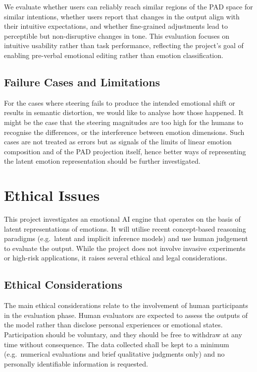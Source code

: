 \documentclass[12pt,twoside]{report}
\begin{document}
We evaluate whether users can reliably reach similar regions of the PAD space for similar intentions, whether users report that changes in the output align with their intuitive expectations, and whether fine-grained adjustments lead to perceptible but non-disruptive changes in tone. This evaluation focuses on intuitive usability rather than task performance, reflecting the project’s goal of enabling pre-verbal emotional editing rather than emotion classification.

\section{Failure Cases and Limitations}

For the cases where steering fails to produce the intended emotional shift or results in semantic distortion, we would like to analyse how those happened. It might be the case that the steering magnitudes are too high for the humans to recognise the differences, or the interference between emotion dimensions. Such cases are not treated as errors but as signals of the limits of linear emotion composition and of the PAD projection itself, hence better ways of representing the latent emotion representation should be further investigated.

\chapter{Ethical Issues}

This project investigates an emotional AI engine that operates on the basis of latent representations of emotions. It will utilise recent concept-based reasoning paradigms (e.g.\ latent and implicit inference models) and use human judgement to evaluate the output. While the project does not involve invasive experiments or high-risk applications, it raises several ethical and legal considerations.

\section{Ethical Considerations}
The main ethical considerations relate to the involvement of human participants in the evaluation phase. Human evaluators are expected to assess the outputs of the model rather than disclose personal experiences or emotional states. Participation should be voluntary, and they should be free to withdraw at any time without consequence. The data collected shall be kept to a minimum (e.g.\ numerical evaluations and brief qualitative judgments only) and no personally identifiable information is requested.
\end{document}
